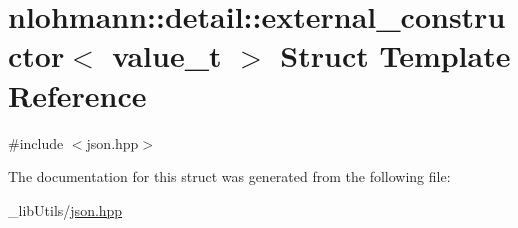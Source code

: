 \hypertarget{structnlohmann_1_1detail_1_1external__constructor}{}\section{nlohmann\+:\+:detail\+:\+:external\+\_\+constructor$<$ value\+\_\+t $>$ Struct Template Reference}
\label{structnlohmann_1_1detail_1_1external__constructor}


{\ttfamily \#include $<$json.\+hpp$>$}



The documentation for this struct was generated from the following file\+:\begin{DoxyCompactItemize}
\item 
\+\_\+lib\+Utils/\hyperlink{json_8hpp}{json.\+hpp}\end{DoxyCompactItemize}

